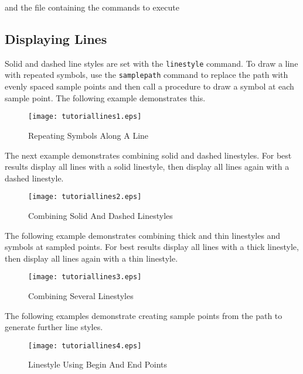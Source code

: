 

and the file containing the commands to execute



\subsection{Displaying Lines}

Solid and dashed line styles are set with the
\texttt{linestyle} command.  To draw a line with repeated symbols, use the
\texttt{samplepath}
command to replace the path with evenly spaced sample points and
then call a procedure to draw a symbol at each sample point.
The following example demonstrates this.



\begin{figure}[h]
\texttt{[image: tutoriallines1.eps]}
\caption{Repeating Symbols Along A Line}
\label{tutoriallines1}
\end{figure}

The next example demonstrates
combining solid and dashed linestyles.
For best results display all lines with a solid linestyle,
then display all lines again with a dashed linestyle.



\begin{figure}[h]
\texttt{[image: tutoriallines2.eps]}
\caption{Combining Solid And Dashed Linestyles}
\label{tutoriallines2}
\end{figure}

The following example demonstrates combining thick and
thin linestyles and symbols at sampled points.
For best results display all lines with a thick linestyle,
then display all lines again with a thin linestyle.



\begin{figure}[h]
\texttt{[image: tutoriallines3.eps]}
\caption{Combining Several Linestyles}
\label{tutoriallines3}
\end{figure}

The following examples demonstrate creating sample points
from the path to generate further line styles.



\begin{figure}[h]
\texttt{[image: tutoriallines4.eps]}
\caption{Linestyle Using Begin And End Points}
\label{tutoriallines4}
\end{figure}

